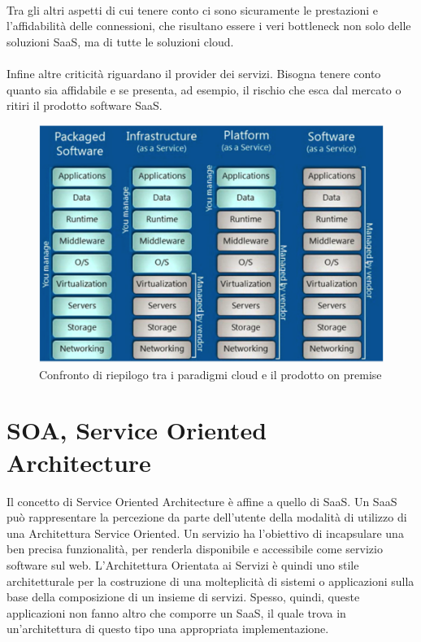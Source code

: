 \paragraph{}
Tra gli altri aspetti di cui tenere conto ci sono sicuramente le prestazioni e l'affidabilità delle connessioni, che risultano essere i veri bottleneck non solo delle soluzioni SaaS, ma di tutte le soluzioni cloud. 
\paragraph{}
Infine altre criticità riguardano il provider dei servizi. Bisogna tenere conto quanto sia affidabile e se presenta, ad esempio, il rischio che esca dal mercato o ritiri il prodotto software SaaS. 

\begin{figure} [h!]
	\centering
	\includegraphics[width=0.7\linewidth]{capitoli/imgs/cloudstacks.png}
	\caption{Confronto di riepilogo tra i paradigmi cloud e il prodotto on premise}
\end{figure}


\section{SOA, Service Oriented Architecture}
Il concetto di Service Oriented Architecture è affine a quello di SaaS. Un SaaS può rappresentare la percezione da parte dell'utente della modalità di utilizzo di una Architettura Service Oriented. Un servizio ha l'obiettivo di incapsulare una ben precisa funzionalità, per renderla disponibile e accessibile come servizio software sul web. L'Architettura Orientata ai Servizi è quindi uno stile architetturale per la costruzione di una molteplicità di sistemi o applicazioni sulla base della composizione di un insieme di servizi. Spesso, quindi, queste applicazioni non fanno altro che comporre un SaaS, il quale trova in un'architettura di questo tipo una appropriata implementazione.

